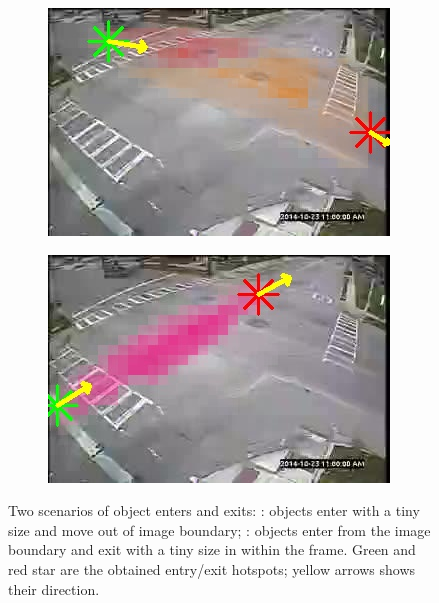 \begin{figure}
\centering
    \begin{subfigure}{0.4\linewidth}
        \includegraphics[width=\linewidth]{./img/semantic_tracker/193402-entry-exit-0.jpg}
        \subcaption{}
        \label{subfig:semantic-extry-exit-eg1}
    \end{subfigure}
    \begin{subfigure}{0.4\linewidth}
        \includegraphics[width=\linewidth]{./img/semantic_tracker/193402-entry-exit-3.jpg}
        \subcaption{}
        \label{subfig:semantic-extry-exit-eg2}
    \end{subfigure}%
    \caption{Two scenarios of object enters and exits: : objects enter with a tiny size and move out of image boundary; : objects enter from the image boundary and exit with a tiny size in within the frame. Green and red star are the obtained entry/exit hotspots; yellow arrows shows their direction.}
    \label{fig:semantic-entry-exit}
\end{figure}